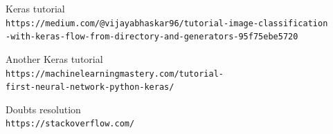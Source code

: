 \documentclass[12pt,english]{article}
\begin{document}
\begin{thebibliography}{9}
Keras tutorial
\\\texttt{https://medium.com/@vijayabhaskar96/tutorial-image-classification\\-with-keras-flow-from-directory-and-generators-95f75ebe5720}

Another Keras tutorial
\\\texttt{https://machinelearningmastery.com/tutorial-\\first-neural-network-python-keras/}

Doubts resolution
\\\texttt{https://stackoverflow.com/}

\end{thebibliography}
\end{document}
